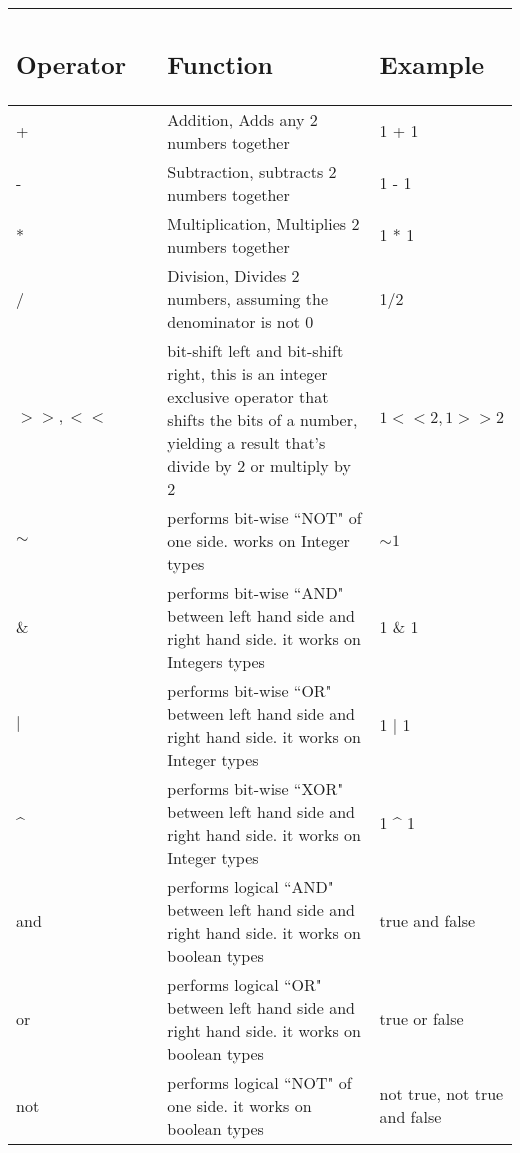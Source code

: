 \documentclass{article}
\begin{document}
\begin{table}[H]
    \centering
    \begin{tabular}{p{0.35\linewidth} | p{0.6\linewidth}| p{0.6\linewidth} }
      
\subsection*{Operator} & \subsection*{Function} & \subsection*{Example}
 \\ \hline
      + & Addition, Adds any 2 numbers together & 1 + 1 \\ \hline
      - & Subtraction, subtracts 2 numbers together  & 1 - 1 \\ \hline
      * & Multiplication, Multiplies 2 numbers together & 1 * 1\\ \hline
      / & Division, Divides 2 numbers, assuming the denominator is not 0 & 1/2 \\ \hline
      $>>,<<$ & bit-shift left and bit-shift right, this is an integer exclusive operator that shifts the bits of a number, yielding a result that's divide by 2 or multiply by 2 & $1 << 2, 1 >> 2$  \\ \hline   
      $\sim$ & performs bit-wise ``NOT" of one side. works on Integer types & $\sim1$  \\ \hline     
       $\&$ & performs bit-wise ``AND" between left hand side and right hand side. it works on Integers types & 1 $\&$ 1   \\ \hline   
      $|$ & performs bit-wise ``OR" between left hand side and right hand side. it works on Integer types & 1 $|$ 1   \\ \hline   
      \^{ } & performs bit-wise ``XOR" between left hand side and right hand side. it works on Integer types & 1 \^{ } 1   \\ \hline   
       and & performs logical ``AND" between left hand side and right hand side. it works on boolean types & true and false   \\ \hline   
      or & performs logical ``OR" between left hand side and right hand side. it works on  boolean types & true or false   \\ \hline   
        not & performs logical ``NOT" of one side. it works on  boolean types & not true, not true and false   \\ \hline   

    \end{tabular}
       
\end{table}
\end{document}
